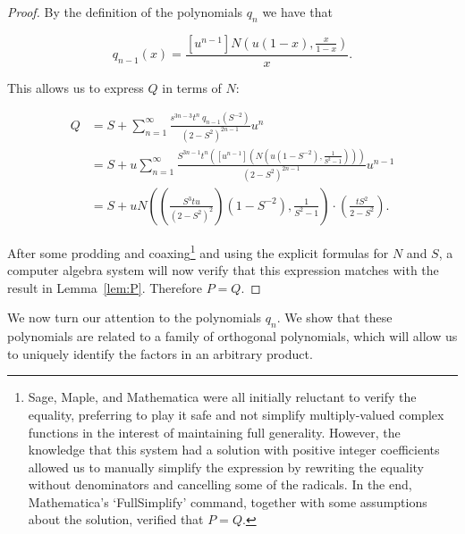 \documentclass[10pt]{article}
\theoremstyle{definition}
\numberwithin{equation}{section}
\numberwithin{figure}{section}
\begin{document}
  \begin{proof}

By the definition of the polynomials $q_n$ we have that 

\[
q_{n-1}(x) = \frac{[u^{n-1}] N\left(u(1-x), \frac{x}{1-x}\right)}{x}.
\]

This allows us to express $Q$ in terms of $N$:

\[
\begin{aligned}
    Q &= S + \sum_{n=1}^\infty \frac{s^{3n-3} t^n \ q_{n-1}(S^{-2})}
              {(2-S^2)^{2n-1}}u^n \\
      &= S + u\sum_{n=1}^\infty \frac{S^{3n-1} t^n 
          \left( [u^{n-1}] \left(N\left(u(1-S^{-2}), \frac{1}{S^2-1}
          \right)\right) \right)}{(2-S^2)^{2n-1}} u^{n-1} \\
      &= S + uN\left(\left( \frac{S^3tu}{(2-S^2)^2}\right)
              \left(1 - S^{-2}\right), \frac{1}{S^2-1}\right) \cdot
              \left(\frac{tS^2}{2-S^2}\right) . 
\end{aligned}
\]

After some prodding and coaxing\footnote{Sage, Maple, and Mathematica were all initially reluctant to verify the equality, preferring to play it safe and not simplify multiply-valued complex functions in the interest of maintaining full generality. However, the knowledge that this system had a solution with positive integer coefficients allowed us to manually simplify the expression by rewriting the equality without denominators and cancelling some of the radicals. In the end, Mathematica's `FullSimplify' command, together with some assumptions about the solution, verified that $P=Q$.} 
and using the explicit formulas for $N$ and $S$, a computer algebra system will now verify that this expression matches with the result in Lemma~\ref{lem:P}.  Therefore $P = Q$.
  \end{proof}

  We now turn our attention to the polynomials $q_n$. We show that these polynomials are related to a family of orthogonal polynomials, which will allow us to uniquely identify the factors in an arbitrary product. 
\end{document}
